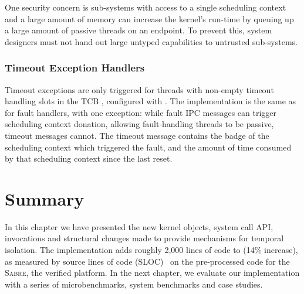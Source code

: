One security concern is sub-systems with access to a single scheduling context and a large amount
of memory can increase the kernel's run-time by queuing up a large amount of passive threads on 
an endpoint. To prevent this, system designers must not hand out large untyped capabilities to
untrusted sub-systems. 

\subsubsection{Timeout Exception Handlers}

Timeout exceptions are only triggered for threads with non-empty timeout handling slots in the
\gls{TCB} \cnode, configured with \tcbsettimeoutep. The implementation is the same as for
fault handlers, with one exception: while fault \gls{IPC} messages can trigger scheduling context
donation, allowing fault-handling threads to be passive, timeout messages cannot. The timeout
message contains the badge of the scheduling context which triggered the fault, and the amount of
time consumed by that scheduling context since the last reset.

\section{Summary}

In this chapter we have presented the new kernel objects, system call API, invocations and 
structural changes made to provide mechanisms for temporal isolation. 
The implementation adds roughly 2,000 lines of code to \selfour (14\% increase), as measured
by source lines of code (SLOC)~\citep{Wheeler_01} on the pre-processed code for the \textsc{Sabre}, the verified platform.
In the next chapter, we evaluate our implementation with a series of microbenchmarks, 
system benchmarks and case studies.


